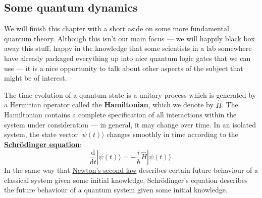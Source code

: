 \documentclass[fleqn,a4paper]{article}
\theoremstyle{definition}
\theoremstyle{definition}
\theoremstyle{definition}
\theoremstyle{definition}
\theoremstyle{remark}
\begin{document}
\hypertarget{some-quantum-dynamics}{%
\subsection{Some quantum dynamics}\label{some-quantum-dynamics}}

We will finish this chapter with a short aside on some more fundamental quantum theory.
Although this isn't our main focus --- we will happily black box away this stuff, happy in the knowledge that some scientists in a lab somewhere have already packaged everything up into nice quantum logic gates that we can use --- it is a nice opportunity to talk about other aspects of the subject that might be of interest.

The time evolution of a quantum state is a unitary process which is generated by a Hermitian operator called the \textbf{Hamiltonian}, which we denote by \(\hat{H}\).
The Hamiltonian contains a complete specification of all interactions within the system under consideration --- in general, it may change over time.
In an isolated system, the state vector \(|\psi(t)\rangle\) changes smoothly in time according to the \href{https://en.wikipedia.org/wiki/Schr\%C3\%B6dinger_equation}{\textbf{Schrödinger equation}}:
\[
  \frac{\mathrm{d}}{\mathrm{d}t} |\psi(t)\rangle
  =-\frac{i}{\hbar} \hat{H}|\psi(t)\rangle.
\]
In the same way that \href{https://en.wikipedia.org/wiki/Newton\%27s_laws_of_motion\%23Second}{Newton's second law} describes certain future behaviour of a classical system given some initial knowledge, Schrödinger's equation describes the future behaviour of a quantum system given some initial knowledge.
\end{document}
